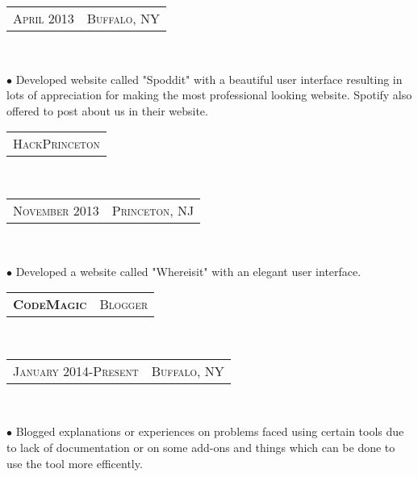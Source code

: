 \documentclass[10pt,a4paper,oneside]{article}
\begin{document}
\begin{minipage}[t]{0.33\textwidth}
{\begin{tabular}{c|c}
                {\small A\textsc{pril 2013}}
                &{\small B\textsc{uffalo}, NY}
            \end{tabular}
        }\\
        \vspace{-12pt}
        \begin{adjustwidth}{7pt}{0pt}
            {\footnotesize  $\bullet$ Developed website called "Spoddit" with a beautiful user interface resulting in lots of appreciation for making the most professional looking website. Spotify also  offered to post about us in their website.}\\
        \end{adjustwidth}
        \vspace{-6pt}
        \begin{tabular}{c}
            {\small H\textsc{ack}P\textsc{rinceton}}
        \end{tabular}\\
        \textcolor{light-gray}{
            \begin{tabular}{c|c}
                {\small N\textsc{ovember 2013}}
                &{\small P\textsc{rinceton}, NJ}
            \end{tabular}
        }\\
        \vspace{-12pt}
        \begin{adjustwidth}{7pt}{0pt}
            {\footnotesize $\bullet$ Developed a website called "Whereisit" with an elegant user interface.}\\
        \end{adjustwidth}
        \begin{tabular}{c|c}
            \textbf{\normalsize C\textsc{ode}M\textsc{agic}}
            &\textmd{\normalsize B\textsc{logger}}
        \end{tabular}\\
        \textcolor{light-gray}{
            \begin{tabular}{c|c}
                {\small J\textsc{anuary 2014}-P\textsc{resent}}
                &{\small B\textsc{uffalo}, NY}
            \end{tabular}
        }\\ 
        \vspace{-4mm}
        \begin{adjustwidth}{7pt}{0pt}
            {\footnotesize $\bullet$ Blogged explanations or experiences on problems faced using certain tools due to lack
            of documentation or on some add-ons and things which can be done to use the tool more efficently.}\\

\end{adjustwidth}
\end{minipage}
\end{document}
